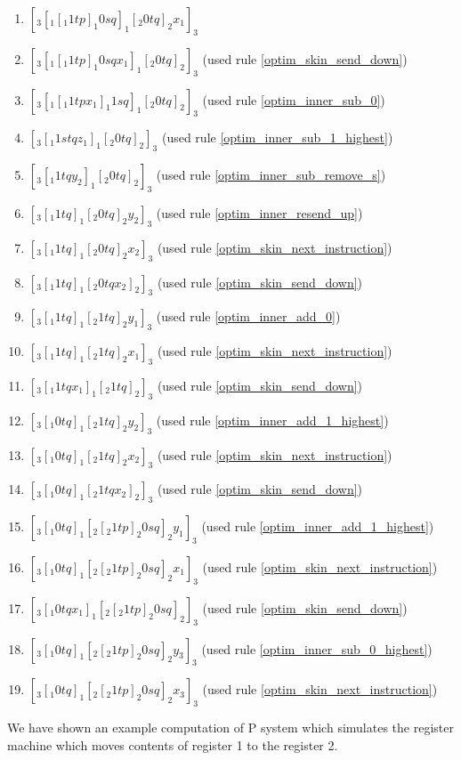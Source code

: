 \begin{example}
      \begin{enumerate}
        \item $[_3 [_1 [_1 1 t p ]_1 0 s q ]_1 [_2 0 t q ]_2 x_1 ]_3$
        \item $[_3 [_1 [_1 1 t p ]_1 0 s q x_1 ]_1 [_2 0 t q ]_2 ]_3$ (used rule \ref{optim_skin_send_down})
        \item $[_3 [_1 [_1 1 t p x_1 ]_1 1 s q ]_1 [_2 0 t q ]_2 ]_3$ (used rule \ref{optim_inner_sub_0})
        \item $[_3 [_1 1 s t q z_1 ]_1 [_2 0 t q ]_2 ]_3$ (used rule \ref{optim_inner_sub_1_highest})
        \item $[_3 [_1 1 t q y_2 ]_1 [_2 0 t q ]_2 ]_3$ (used rule \ref{optim_inner_sub_remove_s})
        \item $[_3 [_1 1 t q ]_1 [_2 0 t q ]_2 y_2 ]_3$ (used rule \ref{optim_inner_resend_up})
        \item $[_3 [_1 1 t q ]_1 [_2 0 t q ]_2 x_2 ]_3$ (used rule \ref{optim_skin_next_instruction})
        \item $[_3 [_1 1 t q ]_1 [_2 0 t q x_2 ]_2 ]_3$ (used rule \ref{optim_skin_send_down})
        \item $[_3 [_1 1 t q ]_1 [_2 1 t q ]_2 y_1 ]_3$ (used rule \ref{optim_inner_add_0})
        \item $[_3 [_1 1 t q ]_1 [_2 1 t q ]_2 x_1 ]_3$ (used rule \ref{optim_skin_next_instruction})
        \item $[_3 [_1 1 t q x_1 ]_1 [_2 1 t q ]_2 ]_3$ (used rule \ref{optim_skin_send_down})
        \item $[_3 [_1 0 t q ]_1 [_2 1 t q ]_2 y_2 ]_3$ (used rule \ref{optim_inner_add_1_highest})
        \item $[_3 [_1 0 t q ]_1 [_2 1 t q ]_2 x_2 ]_3$ (used rule \ref{optim_skin_next_instruction})
        \item $[_3 [_1 0 t q ]_1 [_2 1 t q x_2 ]_2 ]_3$ (used rule \ref{optim_skin_send_down})
        \item $[_3 [_1 0 t q ]_1 [_2 [_2 1 t p ]_2 0 s q ]_2 y_1 ]_3$ (used rule \ref{optim_inner_add_1_highest})
        \item $[_3 [_1 0 t q ]_1 [_2 [_2 1 t p ]_2 0 s q ]_2 x_1 ]_3$ (used rule \ref{optim_skin_next_instruction})
        \item $[_3 [_1 0 t q x_1 ]_1 [_2 [_2 1 t p ]_2 0 s q ]_2 ]_3$ (used rule \ref{optim_skin_send_down})
        \item $[_3 [_1 0 t q ]_1 [_2 [_2 1 t p ]_2 0 s q ]_2 y_3 ]_3$ (used rule \ref{optim_inner_sub_0_highest})
        \item $[_3 [_1 0 t q ]_1 [_2 [_2 1 t p ]_2 0 s q ]_2 x_3 ]_3$ (used rule \ref{optim_skin_next_instruction})
      \end{enumerate}

      We have shown an example computation of P system which simulates the register machine which moves contents of register 1 to the register 2.
    \end{example}

